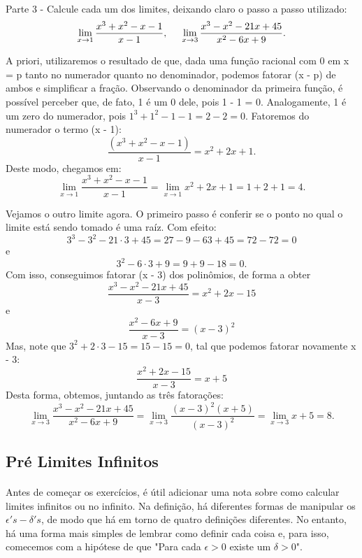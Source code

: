 \documentclass[exercícios_de_cálculo.tex]{subfiles}
\begin{document}
\paragraph{} Parte 3 - Calcule cada um dos limites, deixando claro o passo a passo utilizado:
$$
	\lim_{x\to1} \frac{x^3 + x^2 - x - 1}{x - 1}, \hspace{0.5cm} \lim_{x\to3}\frac{x^3 - x^2 - 21x + 45}{x^2 - 6x + 9}.
$$
\begin{sol*}
	A priori, utilizaremos o resultado de que, dada uma função racional com 0 em x = p tanto no numerador quanto no denominador, podemos fatorar (x - p) de ambos e simplificar a fração. Observando o denominador da primeira funç\~ao, é possível perceber que, de fato, 1 é um 0 dele, pois 1 - 1 = 0. Analogamente, 1 é um zero do numerador, pois $1^3 + 1^2 - 1 - 1 = 2 - 2 = 0$. Fatoremos do numerador o termo (x - 1):
	$$
		\frac{(x^3 + x^2 - x - 1)}{x - 1} = x^2 + 2x + 1.
	$$
	Deste modo, chegamos em:
	$$
		\lim_{x\to{1}}\frac{x^3 + x^2 - x - 1}{x - 1} = \lim_{x\to{1}}x^2 + 2x + 1 = 1 + 2 + 1 = 4.
	$$

	Vejamos o outro limite agora. O primeiro passo é conferir se o ponto no qual o limite está sendo tomado é uma raíz. Com efeito:
	$$
		3^3 - 3^2 - 21\cdot{3} + 45 = 27 - 9 - 63 + 45 = 72 - 72 = 0
	$$
	e
	$$
		3^2 - 6\cdot{3} + 9 = 9 + 9 - 18 = 0.
	$$
	Com isso, conseguimos fatorar (x - 3) dos polinômios, de forma a obter
	$$
		\frac{x^3 - x^2 - 21x + 45}{x-3} = x^2 + 2x - 15
	$$
	e
	$$
		\frac{x^2 - 6x + 9}{x - 3}  = (x - 3)^2
	$$
	Mas, note que $3^2 + 2\cdot{3} - 15 = 15 - 15 = 0$, tal que podemos fatorar novamente x - 3:
	$$
		\frac{x^2 + 2x - 15}{x - 3} = x + 5
	$$
	Desta forma, obtemos, juntando as três fatorações:
	$$
		\lim_{x\to3}\frac{x^3 - x^2 - 21x + 45}{x^2 - 6x + 9} = \lim_{x\to3}\frac{(x - 3)^2 (x+5)}{(x - 3)^2} = \lim_{x\to3}x + 5 = 8.
	$$
	\qedsymbol
\end{sol*}

\subsection{Pré Limites Infinitos}
\paragraph{} Antes de começar os exercícios, é útil adicionar uma nota sobre como calcular limites infinitos ou no infinito. Na definição, há diferentes formas de manipular os $\epsilon's-\delta's$, de modo que há em torno de quatro definições diferentes. No entanto, há uma forma mais simples de lembrar como definir cada coisa e, para isso, comecemos com a hipótese de que "Para cada $\epsilon > 0$ existe um $\delta > 0$".
\end{document}
